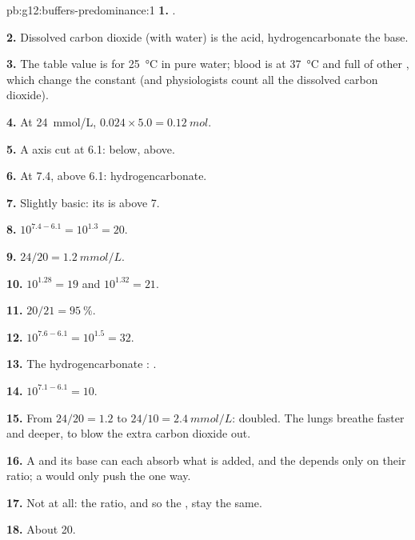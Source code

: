 \begin{solution}{pb:g12:buffers-predominance:1}
\textbf{1.} .

\textbf{2.} Dissolved carbon dioxide (with water) is the acid,
hydrogencarbonate the base.

\textbf{3.} The table value is for \qty{25}{\celsius} in pure water;
blood is at \qty{37}{\celsius} and full of other , which change the
constant (and physiologists count all the dissolved carbon dioxide).

\textbf{4.} At \qty{24}{mmol/L}, $0.024 \times 5.0 = \qty{0.12}{mol}$.

\textbf{5.} A  axis cut at 6.1:  below,  above.

\textbf{6.} At 7.4, above 6.1: hydrogencarbonate.

\textbf{7.} Slightly basic: its  is above 7.

\textbf{8.} $10^{7.4 - 6.1} = 10^{1.3} = 20$.

\textbf{9.} $24 / 20 = \qty{1.2}{mmol/L}$.

\textbf{10.} $10^{1.28} = 19$ and $10^{1.32} = 21$.

\textbf{11.} $20/21 = \qty{95}{\percent}$.

\textbf{12.} $10^{7.6 - 6.1} = 10^{1.5} = 32$.

\textbf{13.} The hydrogencarbonate :
.

\textbf{14.} $10^{7.1 - 6.1} = 10$.

\textbf{15.} From $24/20 = 1.2$ to $24/10 = \qty{2.4}{mmol/L}$: doubled.
The lungs breathe faster and deeper, to blow the extra carbon dioxide
out.

\textbf{16.} A  and its base can each absorb what is added, and
the  depends only on their ratio; a  would only push the
 one way.

\textbf{17.} Not at all: the ratio, and so the , stay the same.

\textbf{18.} About 20.
\end{solution}
